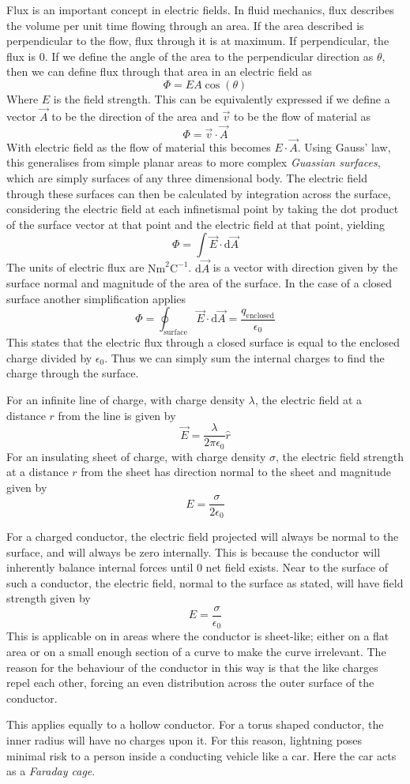 \documentclass[12pt]{report}
\begin{document}
\begin{flushleft}
\bigskip
Flux is an important concept in electric fields. In fluid mechanics, flux 
describes the volume per unit time flowing through an area. If the area 
described is perpendicular to the flow, flux through it is at maximum. If 
perpendicular, the flux is \(0\).  If we define the angle of the area to the
perpendicular direction as \(\theta\), then we can define flux through that 
area in an electric field as
\[\Phi = EA\cos(\theta)\]
Where \(E\) is the field strength. This can be equivalently expressed if we
define a vector \(\vec{A}\) to be the direction of the area and \(\vec{v}\) to
be the flow of material as
\[\Phi = \vec{v} \cdot \vec{A}\]
With electric field as the flow of material this becomes \(E \cdot \vec{A}\).
Using Gauss' law, this generalises from simple planar areas to more complex
\textit{Guassian surfaces}, which are simply surfaces of any three dimensional 
body. The electric field through these surfaces can then be calculated by 
integration across the surface, considering the electric field at each 
infinetismal point by taking the dot product of the surface vector at that
point and the electric field at that point, yielding
\[\Phi = \int\vec{E}\cdot\mathrm{d}\vec{A}\]
The units of electric flux are \(\mathrm{Nm}^2\mathrm{C}^{-1}\). 
\(\mathrm{d}\vec{A}\) is a vector with direction given by the surface normal 
and magnitude of the area of the surface. In the case of a closed surface 
another simplification applies
\[\Phi = \oint_\mathrm{surface}\vec{E}\cdot\mathrm{d}\vec{A} = 
\frac{q_\mathrm{enclosed}}{\epsilon_0}\]
This states that the electric flux through a closed surface is equal to the
enclosed charge divided by \(\epsilon_0\). Thus we can simply sum the internal
charges to find the charge through the surface.

\bigskip
For an infinite line of charge, with charge density \(\lambda\), the electric
field at a distance \(r\) from the line is given by
\[\vec{E} = \frac{\lambda}{2\pi\epsilon_0}\hat{r}\]
For an insulating sheet of charge, with charge density \(\sigma\), the electric
field strength at a distance \(r\) from the sheet has direction normal to the 
sheet and magnitude given by
\[E = \frac{\sigma}{2\epsilon_0}\]

\bigskip
For a charged conductor, the electric field projected will always be normal to
the surface, and will always be zero internally. This is because the conductor
will inherently balance internal forces until \(0\) net field exists. Near to
the surface of such a conductor, the electric field, normal to the surface as
stated, will have field strength given by
\[E = \frac{\sigma}{\epsilon_0}\]
This is applicable on in areas where the conductor is sheet-like; either on a 
flat area or on a small enough section of a curve to make the curve irrelevant.
The reason for the behaviour of the conductor in this way is that the like 
charges repel each other, forcing an even distribution across the outer surface
of the conductor. \par
This applies equally to a hollow conductor. For a torus shaped conductor, the
inner radius will have no charges upon it. For this reason, lightning poses 
minimal risk to a person inside a conducting vehicle like a car. Here the car
acts as a \textit{Faraday cage}.


\end{flushleft}
\end{document}
